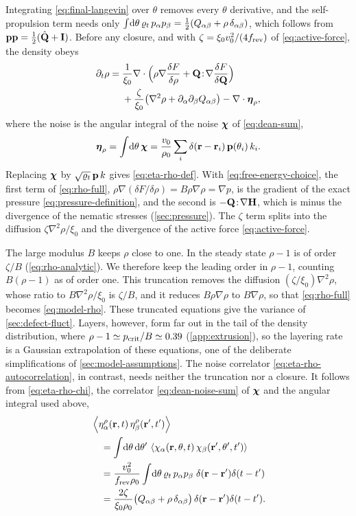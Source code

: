\documentclass[aps,pre,reprint,superscriptaddress,longbibliography,nofootinbib
]{revtex4-2}
\begin{document}
Integrating \cref{eq:final-langevin} over $\theta$ removes
every $\theta$ derivative, and the self-propulsion term
needs only $\int\!\mathrm{d}\theta\,\varrho_t\,p_\alpha
p_\beta=\tfrac12(Q_{\alpha\beta}+\rho\,\delta_{\alpha\beta})$, which follows
from $\mathbf{p}\mathbf{p}=\tfrac12(\hat{\mathbf{Q}}+\mathbf{I})$. Before any closure,
and with $\zeta=\xi_0v_0^2/(4f_{\rm rev})$ of
\cref{eq:active-force}, the density obeys
\begin{align}
  \label{eq:rho-full}
  \partial_t\rho = {}& \frac1{\xi_0}\nabla\cdot\Bigl(\rho\nabla\frac{\delta F}{\delta\rho}
    + \mathbf{Q}\!:\!\nabla\frac{\delta F}{\delta\mathbf{Q}}\Bigr)
  \nonumber\\
  &+\frac{\zeta}{\xi_0}\bigl(\nabla^2\rho+\partial_\alpha\partial_\beta Q_{\alpha\beta}\bigr)
  - \nabla\cdot\boldsymbol\eta_\rho,
\end{align}
where the noise is the angular integral of the noise
$\boldsymbol\chi$ of \cref{eq:dean-sum},
\begin{equation}
  \label{eq:eta-rho-chi}
  \boldsymbol\eta_\rho=\int\!\mathrm{d}\theta\,\boldsymbol\chi
  =\frac{v_0}{\rho_0}\sum_i\delta(\mathbf{r}-\mathbf{r}_i)\,\mathbf{p}(\theta_i)\,k_i .
\end{equation}
Replacing $\boldsymbol\chi$ by $\sqrt{\varrho_t}\,\mathbf{p}\,k$ gives
\cref{eq:eta-rho-def}. With \cref{eq:free-energy-choice},
the first term of \cref{eq:rho-full}, $\rho\nabla(\delta
F/\delta\rho)=B\rho\nabla\rho=\nabla p$, is the gradient of
the exact pressure \cref{eq:pressure-definition}, and the
second is $-\mathbf{Q}\!:\!\nabla\mathbf{H}$, which is minus the divergence
of the nematic stresses (\cref{sec:pressure}). The $\zeta$
term splits into the diffusion $\zeta\nabla^2\rho/\xi_0$
and the divergence of the active force
\cref{eq:active-force}.

The large modulus $B$ keeps $\rho$ close to one. In the
steady state $\rho-1$ is of order $\zeta/B$
(\cref{eq:rho-analytic}). We therefore keep the leading
order in $\rho-1$, counting $B(\rho-1)$ as of order one.
This truncation removes the diffusion
$(\zeta/\xi_0)\nabla^2\rho$, whose ratio to
$B\nabla^2\rho/\xi_0$ is $\zeta/B$, and it reduces
$B\rho\nabla\rho$ to $B\nabla\rho$, so that
\cref{eq:rho-full} becomes \cref{eq:model-rho}. These
truncated equations give the variance of
\cref{sec:defect-fluct}. Layers, however, form far out in
the tail of the density distribution, where
$\rho-1\simeq p_{\rm crit}/B\simeq0.39$ (\cref{app:extrusion}), so
the layering rate is a Gaussian extrapolation of these
equations, one of the deliberate simplifications of
\cref{sec:model-assumptions}. The noise correlator
\cref{eq:eta-rho-autocorrelation}, in contrast, needs
neither the truncation nor a closure. It follows from
\cref{eq:eta-rho-chi}, the correlator
\cref{eq:dean-noise-sum} of $\boldsymbol\chi$ and the angular
integral used above,
\begin{align}
  &\left\langle\eta^\rho_\alpha(\mathbf{r},t)\,\eta^\rho_\beta(\mathbf{r}',t')\right\rangle
  \nonumber\\
  &\quad=\int\!\mathrm{d}\theta\,\mathrm{d}\theta'\,
  \left\langle\chi_\alpha(\mathbf{r},\theta,t)\,\chi_\beta(\mathbf{r}',\theta',t')\right\rangle
  \nonumber\\
  &\quad=\frac{v_0^2}{f_{\rm rev}\rho_0}\int\!\mathrm{d}\theta\,\varrho_t\,p_\alpha p_\beta\;
  \delta(\mathbf{r}-\mathbf{r}')\delta(t-t')
  \nonumber\\
  &\quad=\frac{2\zeta}{\xi_0\rho_0}\bigl(Q_{\alpha\beta}+\rho\,\delta_{\alpha\beta}\bigr)\,
  \delta(\mathbf{r}-\mathbf{r}')\delta(t-t').
\end{align}
\end{document}
